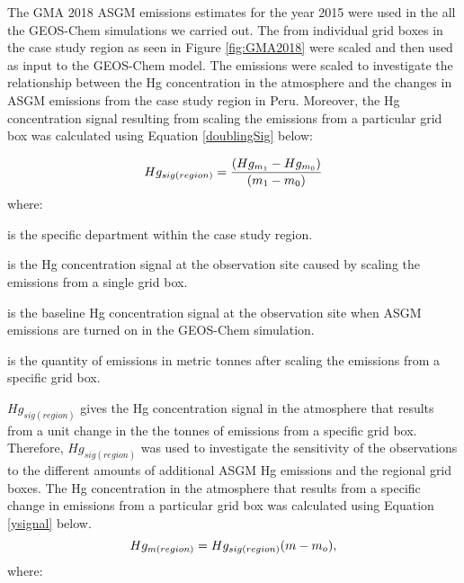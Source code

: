 \begin{flushleft}
The GMA 2018 ASGM emissions estimates for the year 2015 were used in the all the GEOS-Chem simulations we carried out. The  from individual grid boxes in the case study region as seen in Figure \ref{fig:GMA2018} were scaled and then used as input to the GEOS-Chem model. The emissions were scaled to investigate the relationship between the Hg concentration in the atmosphere and the changes in ASGM emissions from the case study region in Peru. Moreover, the Hg concentration signal resulting from scaling the emissions from a particular grid box was calculated using Equation \ref{doublingSig} below:
\end{flushleft}

\begin{flushleft}
\begin{equation}
\label{doublingSig}
Hg_{sig(region)}=\small\frac{(Hg_{m_1} -Hg_{m_0})}{(m_1 -m_0)}
\end{equation}
where:
\end{flushleft}

\begin{description}[leftmargin=!,labelwidth={3 em}]
    \item [$region$] is the specific department within the case study region.
    \item [$Hg_{m_1}$] is the Hg concentration signal at the observation site caused by scaling the emissions from a single grid box. 
    \item [$Hg_{m_0}$] is the baseline Hg concentration signal at the observation site when ASGM emissions are turned on in the GEOS-Chem simulation.
    \item [$m_1$] is the quantity of emissions in metric tonnes after scaling the emissions from a specific grid box.
\end{description}


\begin{flushleft}
$Hg_{sig(region)}$ gives the Hg concentration signal in the atmosphere that results from a unit change in the the tonnes of emissions from a specific grid box. Therefore, $Hg_{sig(region)}$ was used to investigate the sensitivity of the observations to the different amounts of additional ASGM Hg emissions and the regional grid boxes. The Hg concentration in the atmosphere that results from a specific change in emissions from a particular grid box was calculated using Equation \ref{ysignal} below.
\begin{equation}
\label{ysignal}
\small{Hg_{m(region)}} =Hg_{sig(region)}(m-m_o), 
\end{equation}
where:
\end{flushleft}


